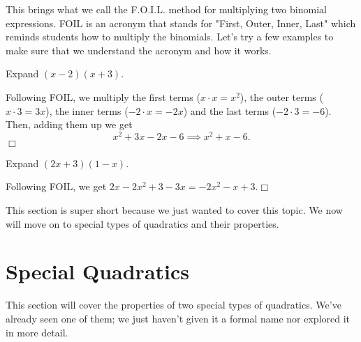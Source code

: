\documentclass[lang=en,11pt]{elegantbook}
\begin{document}
This brings what we call the F.O.I.L.  method for multiplying two binomial expressions.  FOIL is an acronym that stands for "First, Outer, Inner, Last" which reminds students how to multiply the binomials.  Let's try a few examples to make sure that we understand the acronym and how it works.
\begin{example}
Expand $(x-2)(x+3)$.
\end{example}
\begin{solution}
Following FOIL, we multiply the first terms ($x\cdot x=x^2$), the outer terms ($x\cdot 3=3x$), the inner terms ($-2\cdot x=-2x$) and the last terms ($-2 \cdot 3=-6$).  Then, adding them up we get $$x^2+3x-2x-6 \implies x^2+x-6.$$ $\Box$
\end{solution}
\begin{example}
Expand $(2x+3)(1-x)$.
\end{example}
\begin{solution}
Following FOIL, we get $2x-2x^2+3-3x=-2x^2-x+3$.$\Box$
\end{solution}
\noindent This section is super short because we just wanted to cover this topic.  We now will move on to special types of quadratics and their properties.
\section{Special Quadratics}
\noindent This section will cover the properties of two special types of quadratics.  We've already seen one of them; we just haven't given it a formal name nor explored it in more detail.
\end{document}
